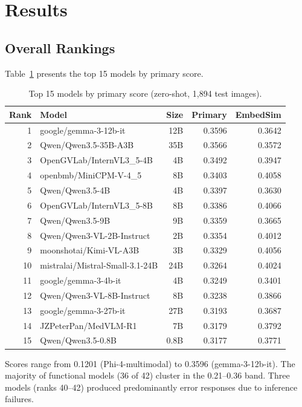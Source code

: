 \documentclass[11pt,a4paper]{article}
\begin{document}
\section{Results}

\subsection{Overall Rankings}

Table~\ref{tab:top15} presents the top 15 models by primary score.

\begin{table}[H]
\centering
\caption{Top 15 models by primary score (zero-shot, 1,894 test images).}
\label{tab:top15}
\begin{tabular}{rlrrr}
\toprule
\textbf{Rank} & \textbf{Model} & \textbf{Size} & \textbf{Primary} & \textbf{EmbedSim} \\
\midrule
1 & google/gemma-3-12b-it & 12B & 0.3596 & 0.3642 \\
2 & Qwen/Qwen3.5-35B-A3B & 35B & 0.3566 & 0.3572 \\
3 & OpenGVLab/InternVL3\_5-4B & 4B & 0.3492 & 0.3947 \\
4 & openbmb/MiniCPM-V-4\_5 & 8B & 0.3403 & 0.4058 \\
5 & Qwen/Qwen3.5-4B & 4B & 0.3397 & 0.3630 \\
6 & OpenGVLab/InternVL3\_5-8B & 8B & 0.3386 & 0.4066 \\
7 & Qwen/Qwen3.5-9B & 9B & 0.3359 & 0.3665 \\
8 & Qwen/Qwen3-VL-2B-Instruct & 2B & 0.3354 & 0.4012 \\
9 & moonshotai/Kimi-VL-A3B & 3B & 0.3329 & 0.4056 \\
10 & mistralai/Mistral-Small-3.1-24B & 24B & 0.3264 & 0.4024 \\
11 & google/gemma-3-4b-it & 4B & 0.3249 & 0.3401 \\
12 & Qwen/Qwen3-VL-8B-Instruct & 8B & 0.3238 & 0.3866 \\
13 & google/gemma-3-27b-it & 27B & 0.3193 & 0.3687 \\
14 & JZPeterPan/MedVLM-R1 & 7B & 0.3179 & 0.3792 \\
15 & Qwen/Qwen3.5-0.8B & 0.8B & 0.3177 & 0.3771 \\
\bottomrule
\end{tabular}
\end{table}

Scores range from 0.1201 (Phi-4-multimodal) to 0.3596 (gemma-3-12b-it). The majority of functional models (36 of 42) cluster in the 0.21--0.36 band. Three models (ranks 40--42) produced predominantly error responses due to inference failures.
\end{document}
